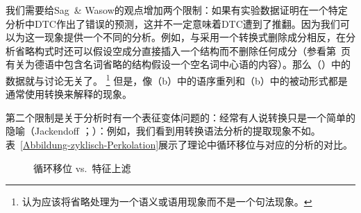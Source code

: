 我们需要给Sag~\& Wasow的观点增加两个限制：如果有实验数据证明在一个特定分析中DTC作出了错误的预测，这并不一定意味着DTC遭到了推翻。因为我们可以为这一现象提供一个不同的分析。例如，与采用一个转换式删除成分相反，在分析省略构式时还可以假设空成分直接插入一个结构而不删除任何成分（参看第~\pageref{np-epsilon}页有关为德语中包含名词省略的结构假设一个空名词中心语的内容）。那么（）中的数据就与讨论无关了。 
\footnote{%
 \citet[\S~1, \S~7]{CJ2005a}认为应该将省略处理为一个语义或语用现象而不是一个句法现象。 
} 但是，像（b）中的语序重列和（b）中的被动形式都是通常使用转换来解释的现象。

第二个限制是关于分析时有一个表征变体问题的：经常有人说转换只是一个简单的隐喻（Jackendoff \citeyear[--23]{Jackendoff2000a}；\citeyear[, 20]{Jackendoff2007a}）：例如，我们看到用转换语法分析的提取现象不如\hpsgc。表~\vref{Abbildung-zyklisch-Perkolation}展示了\gbc 理论中循环移位与对应的\hpsgc 分析的对比。
\begin{figure}
\hfill%
\hfill
{}
\hfill\mbox{}%
\caption{循环移位 vs.\ 特征上滤}\label{Abbildung-zyklisch-Perkolation}
\end{figure}%


